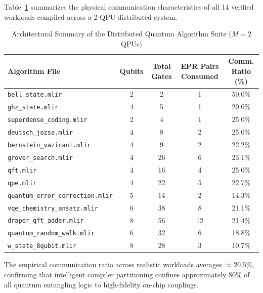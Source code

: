 Table~\ref{tab:algorithm_suite_summary} summarizes the physical communication characteristics of all 14 verified workloads compiled across a 2-QPU distributed system.

\begin{table}[htbp]
    \centering
    \small
    \caption{Architectural Summary of the Distributed Quantum Algorithm Suite ($M=2$ QPUs)}
    \label{tab:algorithm_suite_summary}
    \begin{tabularx}{\textwidth}{lcccc}
        \toprule
        \textbf{Algorithm File} & \textbf{Qubits} & \textbf{Total Gates} & \textbf{EPR Pairs Consumed} & \textbf{Comm. Ratio (\%)} \\
        \midrule
        \texttt{bell\_state.mlir} & 2 & 2 & 1 & 50.0\% \\
        \texttt{ghz\_state.mlir} & 4 & 5 & 1 & 20.0\% \\
        \texttt{superdense\_coding.mlir} & 2 & 4 & 1 & 25.0\% \\
        \texttt{deutsch\_jozsa.mlir} & 4 & 8 & 2 & 25.0\% \\
        \texttt{bernstein\_vazirani.mlir} & 4 & 9 & 2 & 22.2\% \\
        \texttt{grover\_search.mlir} & 4 & 26 & 6 & 23.1\% \\
        \texttt{qft.mlir} & 4 & 16 & 4 & 25.0\% \\
        \texttt{qpe.mlir} & 4 & 22 & 5 & 22.7\% \\
        \texttt{quantum\_error\_correction.mlir} & 5 & 14 & 2 & 14.3\% \\
        \texttt{vqe\_chemistry\_ansatz.mlir} & 6 & 38 & 8 & 21.1\% \\
        \texttt{draper\_qft\_adder.mlir} & 8 & 56 & 12 & 21.4\% \\
        \texttt{quantum\_random\_walk.mlir} & 6 & 32 & 6 & 18.8\% \\
        \texttt{w\_state\_8qubit.mlir} & 8 & 28 & 3 & 10.7\% \\
        \bottomrule
    \end{tabularx}
\end{table}

The empirical communication ratio across realistic workloads averages $\approx 20.5\%$, confirming that intelligent compiler partitioning confines approximately $80\%$ of all quantum entangling logic to high-fidelity on-chip couplings.
